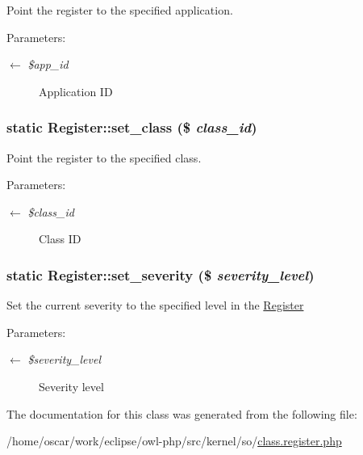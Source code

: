 Point the register to the specified application.

\begin{Desc}
\item[Parameters:]
\begin{description}
\item[\mbox{$\leftarrow$} {\em \$app\_\-id}]Application ID \end{description}
\end{Desc}
\hypertarget{classRegister_58e49ccb1fe4e441d0329e879c922aa0}{
\subsubsection{\setlength{\rightskip}{0pt plus 5cm}static Register::set\_\-class (\$ {\em class\_\-id})}}
\label{classRegister_58e49ccb1fe4e441d0329e879c922aa0}


Point the register to the specified class.

\begin{Desc}
\item[Parameters:]
\begin{description}
\item[\mbox{$\leftarrow$} {\em \$class\_\-id}]Class ID \end{description}
\end{Desc}
\hypertarget{classRegister_0adde8d67d77b9b4d66156272cb48ae4}{
\subsubsection{\setlength{\rightskip}{0pt plus 5cm}static Register::set\_\-severity (\$ {\em severity\_\-level})}}
\label{classRegister_0adde8d67d77b9b4d66156272cb48ae4}


Set the current severity to the specified level in the \hyperlink{classRegister}{Register}

\begin{Desc}
\item[Parameters:]
\begin{description}
\item[\mbox{$\leftarrow$} {\em \$severity\_\-level}]Severity level \end{description}
\end{Desc}


The documentation for this class was generated from the following file:\begin{CompactItemize}
\item 
/home/oscar/work/eclipse/owl-php/src/kernel/so/\hyperlink{class_8register_8php}{class.register.php}\end{CompactItemize}
